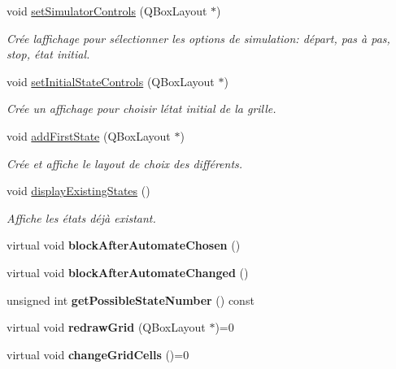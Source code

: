 \begin{DoxyCompactItemize}
void \mbox{\hyperlink{class_simulator_interface_a74b0da33c4faa1198ac70d2a0783be42}{set\+Simulator\+Controls}} (Q\+Box\+Layout $\ast$)
\begin{DoxyCompactList}\small\item\em Crée l\textquotesingle{}affichage pour sélectionner les options de simulation\+: départ, pas à pas, stop, état initial. \end{DoxyCompactList}\item 
void \mbox{\hyperlink{class_simulator_interface_a27e4c2a6ac36793d3e265e367b457484}{set\+Initial\+State\+Controls}} (Q\+Box\+Layout $\ast$)
\begin{DoxyCompactList}\small\item\em Crée un affichage pour choisir l\textquotesingle{}état initial de la grille. \end{DoxyCompactList}\item 
void \mbox{\hyperlink{class_simulator_interface_a2f46c39ef7fca910be2f5cc377850ff4}{add\+First\+State}} (Q\+Box\+Layout $\ast$)
\begin{DoxyCompactList}\small\item\em Crée et affiche le layout de choix des différents. \end{DoxyCompactList}\item 
\mbox{\label{class_simulator_interface_a55deee049c569d2e227e4f38de50e739}} 
void \mbox{\hyperlink{class_simulator_interface_a55deee049c569d2e227e4f38de50e739}{display\+Existing\+States}} ()
\begin{DoxyCompactList}\small\item\em Affiche les états déjà existant. \end{DoxyCompactList}\item 
\mbox{\label{class_simulator_interface_ae775569ca3e3b9e7c7fff5128f75e547}} 
virtual void {\bfseries block\+After\+Automate\+Chosen} ()
\item 
\mbox{\label{class_simulator_interface_a6ccd6546759369e6ac281b2212733eb3}} 
virtual void {\bfseries block\+After\+Automate\+Changed} ()
\item 
\mbox{\label{class_simulator_interface_a659292013fc63d8cc31a67b76c30a9da}} 
unsigned int {\bfseries get\+Possible\+State\+Number} () const
\item 
\mbox{\label{class_simulator_interface_a96847addfbe5f6265cdac881deba8871}} 
virtual void {\bfseries redraw\+Grid} (Q\+Box\+Layout $\ast$)=0
\item 
\mbox{\label{class_simulator_interface_ac37a092f76517e1b13fdb75e9e9fa072}} 
virtual void {\bfseries change\+Grid\+Cells} ()=0
\end{DoxyCompactItemize}
